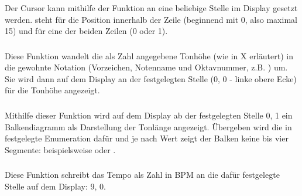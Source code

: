 \subsubsection{}
Der Cursor kann mithilfe der Funktion  an eine beliebige Stelle im Display gesetzt werden.  steht für die Position innerhalb der Zeile (beginnend mit 0, also maximal 15) und  für eine der beiden Zeilen (0 oder 1).

\subsubsection{}
Diese Funktion wandelt die als Zahl angegebene Tonhöhe (wie in X erläutert) %
in die gewohnte Notation (Vorzeichen, Notenname und Oktavnummer, z.B. ) um. Sie wird dann auf dem Display an der festgelegten Stelle (0, 0 - linke obere Ecke) für die Tonhöhe angezeigt.

\subsubsection{}
Mithilfe dieser Funktion wird auf dem Display ab der festgelegten Stelle 0, 1 ein Balkendiagramm als Darstellung der Tonlänge angezeigt. Übergeben wird die in  festgelegte Enumeration dafür und je nach Wert zeigt der Balken keine bis vier Segmente: beispielsweise \lcdtext{[OOO.]} oder \lcdtext{[....]}.

\subsubsection{}
Diese Funktion schreibt das Tempo als Zahl in BPM an die dafür festgelegte Stelle auf dem Display: 9, 0.
